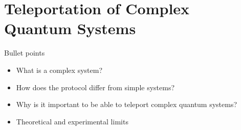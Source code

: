 \section{Teleportation of Complex Quantum Systems}
\begin{mybox}{Bullet points}
    \begin{itemize}
        \item What is a complex system?
        \item How does the protocol differ from simple systems?
        \item Why is it important to be able to teleport complex quantum systems?
        \item Theoretical and experimental limits
    \end{itemize}
\end{mybox}
